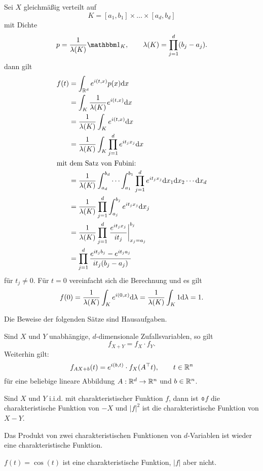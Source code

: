 Sei $X$ gleichmäßig verteilt auf
\[ K = [a_1, b_1] \times \ldots \times [a_d, b_d] \]
mit Dichte
\[ p = \rez{\lambda(K)} \ind_K, \qquad \lambda(K) = \prod_{j=1}^d (b_j - a_j). \]
dann gilt
\begin{align*}
  f(t)
  &= \int_{\mathbb{R}^d} e^{i(t,x)} p(x) \mathrm{d} x \\
  &= \int_K \frac{1}{\lambda(K)} e^{i(t,x)} \mathrm{d} x \\
  &= \frac{1}{\lambda(K)} \int_K e^{i(t,x)} \mathrm{d} x \\
  &= \frac{1}{\lambda(K)} \int_K \prod_{j=1}^d e^{i t_j x_j} \mathrm{d} x \\
  \intertext{mit dem Satz von Fubini:}
  &= \frac{1}{\lambda(K)} \int_{a_d}^{b_d} \cdots \int_{a_1}^{b_1}
    \prod_{j=1}^d e^{i t_j x_j} \mathrm{d} x_1 \mathrm{d} x_2 \cdots \mathrm{d} x_d \\
  &= \frac{1}{\lambda(K)} \prod_{j=1}^d \int_{a_j}^{b_j} e^{i t_j x_j} \mathrm{d} x_j \\
  &= \frac{1}{\lambda(K)} \prod_{j=1}^d
    \left. \frac{e^{i t_j x_j}}{i t_j} \right|_{x_j = a_j}^{b_j} \\
  &= \prod_{j=1}^d \frac{e^{i t_j b_j} - e^{i t_j a_j}}{i t_j (b_j - a_j)}
\end{align*}
für $t_j \ne 0$. Für $t = 0$ vereinfacht sich die Berechnung und es gilt
\[ f(0) = \frac{1}{\lambda(K)} \int_K e^{i(0,x)} \mathrm{d} \lambda
  = \frac{1}{\lambda(K)} \int_K 1 \mathrm{d} \lambda = 1. \]

Die Beweise der folgenden Sätze sind Hausaufgaben.

\begin{thm}
  Sind $X$ und $Y$ unabhängige, $d$-dimensionale Zufallsvariablen, so gilt
  \[ f_{X+Y} = f_X \cdot f_Y. \]
  Weiterhin gilt:
  \[ f_{AX + b}(t) = e^{i(b,t)} \cdot f_X(A^\top t), \qquad t \in \mathbb{R}^n \]
  für eine beliebige lineare Abbildung $A : \mathbb{R}^d \to \mathbb{R}^n$ und $b \in
  \mathbb{R}^n$.
\end{thm}

\begin{folg}
  Sind $X$ und $Y$ i.i.d. mit charakteristischer Funktion $f$, dann ist
  $\obar{f}$ die charakteristische Funktion von $-X$ und $|f|^2$ ist die
  charakteristische Funktion von $X - Y$.
\end{folg}

\begin{folg}
  Das Produkt von zwei charakteristischen Funktionen von $d$-Variablen ist
  wieder eine charakteristische Funktion.
\end{folg}

\begin{rmrk*}
  $f(t) = \cos(t)$ ist eine charakteristische Funktion, $|f|$ aber nicht.
\end{rmrk*}

